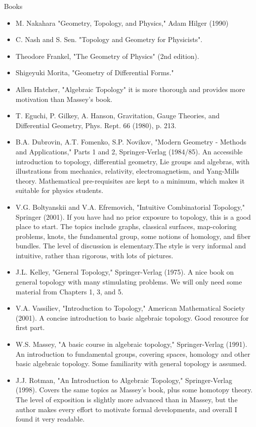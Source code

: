 \documentclass[10pt,a4paper]{book}
\theoremstyle{definition}
\begin{document}
Books
\begin{itemize}
\item M. Nakahara  "Geometry, Topology, and Physics," Adam Hilger (1990)
\item C. Nash and S. Sen. "Topology and Geometry for Physicists". 
\item Theodore Frankel, "The Geometry of Physics" (2nd edition).
\item Shigeyuki Morita, "Geometry of Differential Forms." 
\item Allen Hatcher, "Algebraic Topology" it is more thorough and provides more motivation than Massey's book.
\item T. Eguchi, P. Gilkey, A. Hanson, Gravitation, Gauge Theories, and Differential Geometry, Phys. Rept. 66 (1980), p. 213.
\item    B.A. Dubrovin, A.T. Fomenko, S.P. Novikov, "Modern Geometry - Methods and Applications," Parts 1 and 2, Springer-Verlag (1984/85). An accessible introduction to topology, differential geometry, Lie groups and algebras, with illustrations from mechanics, relativity, electromagnetism, and Yang-Mills theory. Mathematical pre-requisites are kept to a minimum, which makes it suitable for physics students.
\item    V.G. Boltyanskii and V.A. Efremovich, "Intuitive Combinatorial Topology," Springer (2001). If you have had no prior exposure to topology, this is a good place to start.  The topics include graphs, classical surfaces, map-coloring problems, knots, the fundamental group, some notions of homology, and fiber bundles. The level of discussion is elementary.The style is very informal and intuitive, rather than rigorous,  with lots of pictures.
\item    J.L. Kelley, "General Topology," Springer-Verlag (1975). A nice book on general topology with many stimulating problems. We will only need some material from Chapters 1, 3, and 5.
\item    V.A. Vassiliev, "Introduction to Topology," American Mathematical Society (2001). A concise introduction to basic algebraic topology. Good resource for first part.
\item    W.S. Massey, "A basic course in algebraic topology," Springer-Verlag (1991). An introduction to  fundamental groups, covering spaces, homology and other basic algebraic topology. Some familiarity with general topology is assumed.
\item    J.J. Rotman, "An Introduction to Algebraic Topology," Springer-Verlag (1998). Covers the same topics as Massey's book, plus some homotopy theory. The level of exposition is slightly more advanced than in Massey, but the author makes every effort to motivate formal developments, and overall I found it very readable.

\end{itemize}
\end{document}
